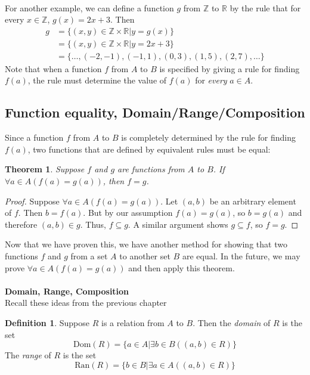 \documentclass{report}
\newtheorem*{theorem}{Theorem}
\theoremstyle{definition}
\newtheorem*{definition}{Definition}
\begin{document}
\vspace{1mm}\\
For another example, we can define a function $g$ from $\mathbb Z$ to $\mathbb R$ by the rule that for every $x\in\mathbb Z$, $g(x)=2x+3$. Then 
\begin{align*}
g&=\{(x,y)\in\mathbb Z\times\mathbb R|y=g(x)\}\\
&=\{(x,y)\in\mathbb Z\times\mathbb R|y=2x+3\}\\
&=\{\ldots,(-2,-1),(-1,1),(0,3),(1,5),(2,7),\ldots\}
\end{align*}
Note that when a function $f$ from $A$ to $B$ is specified by giving a rule for finding $f(a)$, the rule must determine the value of $f(a)$ for \textit{every} $a\in A$.
\newpage

\subsection{Function equality, Domain/Range/Composition}
Since a function $f$ from $A$ to $B$ is completely determined by the rule for finding $f(a)$, two functions that are defined by equivalent rules must be equal:
\begin{theorem}
Suppose $f$ and $g$ are functions from $A$ to $B$. If $\forall a\in A(f(a)=g(a))$, then $f=g$.
\end{theorem}
\begin{proof}
Suppose $\forall a\in A(f(a)=g(a))$. Let $(a,b)$ be an arbitrary element of $f$. Then $b=f(a)$. But
by our assumption $f(a)=g(a)$, so $b=g(a)$ and therefore $(a,b)\in g$. Thus, $f\subseteq g$. 
A similar argument shows $g\subseteq f$, so $f=g$.
\end{proof}
\noindent Now that we have proven this, we have another method for showing that two functions $f$ and $g$ from a set $A$ to another set $B$ are equal. In the future, 
we may prove $\forall a\in A(f(a)=g(a))$ and then apply this theorem.\\
\vspace{1mm}\\
\textbf{Domain, Range, Composition}\\
Recall these ideas from the previous chapter
\begin{definition}
Suppose $R$ is a relation from $A$ to $B$. Then the \textit{domain} of $R$ is the set
\begin{equation*}
\text{Dom}(R)=\{a\in A|\exists b\in B((a,b)\in R)\}
\end{equation*}
The \textit{range} of $R$ is the set
\begin{equation*}
\text{Ran}(R)=\{b\in B|\exists a\in A((a,b)\in R)\}
\end{equation*}
\end{definition}
\end{document}
